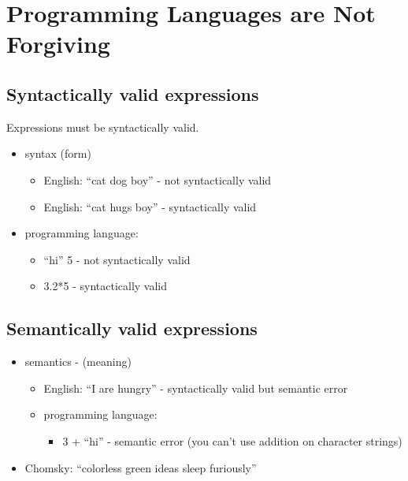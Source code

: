 \documentclass[
]{book}
\providecommand{\tightlist}{%
  \setlength{\itemsep}{0pt}\setlength{\parskip}{0pt}}
\begin{document}
\hypertarget{programming-languages-are-not-forgiving}{%
\section{Programming Languages are Not Forgiving}\label{programming-languages-are-not-forgiving}}

\hypertarget{syntactically-valid-expressions}{%
\subsection{Syntactically valid expressions}\label{syntactically-valid-expressions}}

Expressions must be syntactically valid.

\begin{itemize}
\tightlist
\item
  syntax (form)

  \begin{itemize}
  \tightlist
  \item
    English: ``cat dog boy'' - not syntactically valid
  \item
    English: ``cat hugs boy'' - syntactically valid
  \end{itemize}
\item
  programming language:

  \begin{itemize}
  \tightlist
  \item
    ``hi'' 5 - not syntactically valid
  \item
    3.2*5 - syntactically valid
  \end{itemize}
\end{itemize}

\hypertarget{semantically-valid-expressions}{%
\subsection{Semantically valid expressions}\label{semantically-valid-expressions}}

\begin{itemize}
\tightlist
\item
  semantics - (meaning)

  \begin{itemize}
  \tightlist
  \item
    English: ``I are hungry'' - syntactically valid but semantic error
  \item
    programming language:

    \begin{itemize}
    \tightlist
    \item
      3 + ``hi'' - semantic error (you can't use addition on character strings)
    \end{itemize}
  \end{itemize}
\item
  Chomsky:
  ``colorless green ideas sleep furiously''
\end{itemize}
\end{document}
